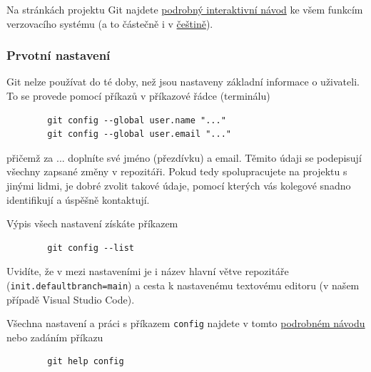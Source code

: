 \documentclass[a4paper,11pt,twoside]{article}
\def\code#1{\textnormal{\texttt{#1}}}
\theoremstyle{red}
\theoremstyle{green}
\begin{document}
    Na stránkách projektu Git najdete \href{https://git-scm.com/book/en/v2}{podrobný interaktivní návod} ke všem funkcím verzovacího systému (a to částečně i v \href{https://git-scm.com/book/cs/v2}{češtině}).

\subsubsection{Prvotní nastavení}
    Git nelze používat do té doby, než jsou nastaveny základní informace o uživateli.
    To se provede pomocí příkazů v příkazové řádce (terminálu)
    \begin{lstlisting}
        git config --global user.name "..."
        git config --global user.email "..."\end{lstlisting}
    přičemž za ... doplníte své jméno (přezdívku) a email.
    Těmito údaji se podepisují všechny zapsané změny v repozitáři.
    Pokud tedy spolupracujete na projektu s jinými lidmi, je dobré zvolit takové údaje, pomocí kterých vás kolegové snadno identifikují a úspěšně kontaktují.

    Výpis všech nastavení získáte příkazem
    \begin{lstlisting}
        git config --list\end{lstlisting}
    Uvidíte, že v mezi nastaveními je i název hlavní větve repozitáře (\code{init.defaultbranch=main}) a cesta k nastavenému textovému editoru (v našem případě Visual Studio Code).

    Všechna nastavení a práci s příkazem \code{config} najdete v tomto \href{https://git-scm.com/docs/git-config}{podrobném návodu} nebo zadáním příkazu
    \begin{lstlisting}
        git help config\end{lstlisting}
\end{document}
